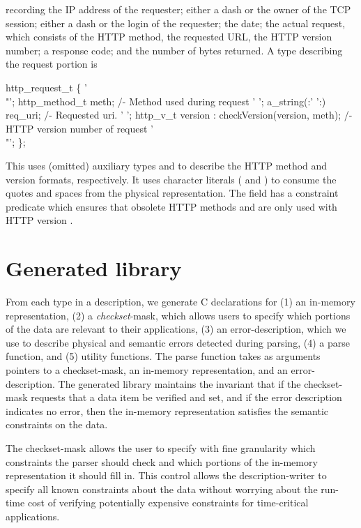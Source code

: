 \documentclass[10pt]{article}
\begin{document}
\noindent
recording the IP address of the requester; either a dash or the owner
of the TCP session; either a dash or the login of the requester; the
date; the actual request, which consists of the HTTP method, the
requested URL, the HTTP version number; a response code; and the
number of bytes returned.  A \padsl{} type describing the request
portion is
\begin{code}
 http_request_t \{
  '\\"'; http_method_t   meth;           /- Method used during request
  ' ';  a_string(:' ':) req_uri;        /- Requested uri.
  ' ';  http_v_t        version : checkVersion(version, meth);
                                        /- HTTP version number of request 
  '\\"';
\};
\end{code}
This  uses (omitted) auxiliary types  and
 to describe
the HTTP method and version formats, respectively.
It uses character literals ( and ) to consume
the quotes and 
spaces from the physical representation. 
The  field has a constraint predicate 
which ensures that obsolete HTTP methods  and  
are only used with HTTP version .

\smallerend{}
\section{Generated library}
\smallersp
From each type in a \padsl{} description, we generate C declarations for
(1) an in-memory representation, 
(2) a {\em checkset}\/-mask, which allows users to specify 
which portions of the data are relevant to their applications,
(3) an error-description, which we use to describe physical and
semantic errors detected during parsing, 
(4) a parse function, and 
(5) utility functions.
The parse function takes as arguments pointers to a checkset-mask, an
in-memory representation, and an error-description.  The generated
library maintains the invariant that if the checkset-mask requests
that a data item be verified and set, and if the error description
indicates no error, then the in-memory representation satisfies the
semantic constraints on the data.

The checkset-mask allows the user to specify with fine granularity
which constraints the parser should check and which portions of the
in-memory representation it should fill in.  This control allows the
description-writer to specify all known constraints about the data
without worrying about the run-time cost of verifying potentially
expensive constraints for time-critical applications.
\end{document}
